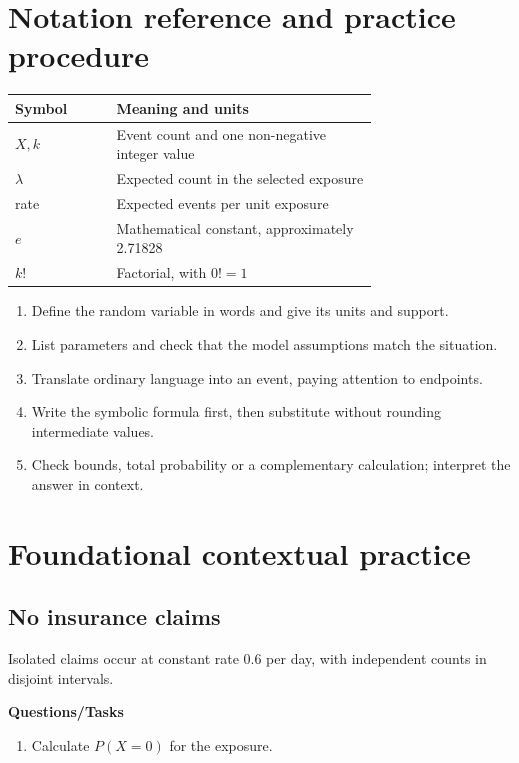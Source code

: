 \section{Notation reference and practice procedure}
\begin{center}
\begin{tabular}{lp{0.72\linewidth}}
\toprule
Symbol & Meaning and units \\ \midrule
$X,k$ & Event count and one non-negative integer value \\
$\lambda$ & Expected count in the selected exposure \\
rate & Expected events per unit exposure \\
$e$ & Mathematical constant, approximately 2.71828 \\
$k!$ & Factorial, with $0!=1$ \\
\bottomrule
\end{tabular}
\end{center}
\begin{enumerate}
\item Define the random variable in words and give its units and support.
\item List parameters and check that the model assumptions match the situation.
\item Translate ordinary language into an event, paying attention to endpoints.
\item Write the symbolic formula first, then substitute without rounding intermediate values.
\item Check bounds, total probability or a complementary calculation; interpret the answer in context.
\end{enumerate}
\section{Foundational contextual practice}\label{sec:t2-c7-foundational}
\subsection{No insurance claims}
Isolated claims occur at constant rate 0.6 per day, with independent counts in disjoint intervals.

\textbf{Questions/Tasks}
\begin{enumerate}
\item Calculate $P(X=0)$ for the exposure. 
\end{enumerate}
